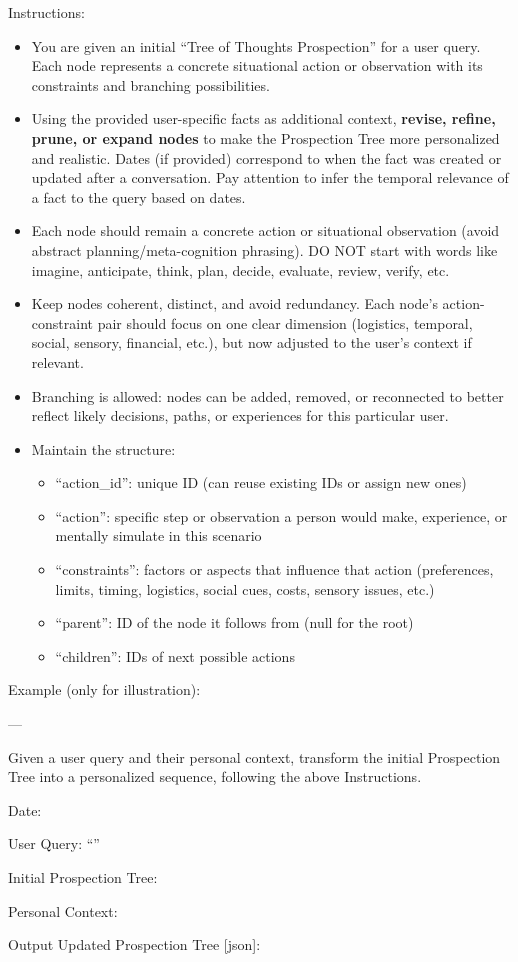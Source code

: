 \begin{promptbox}
Instructions:
\begin{itemize}
  \item You are given an initial ``Tree of Thoughts Prospection'' for a user query. Each node represents a concrete situational action or observation with its constraints and branching possibilities.
  \item Using the provided user-specific facts as additional context, \textbf{revise, refine, prune, or expand nodes} to make the Prospection Tree more personalized and realistic. Dates (if provided) correspond to when the fact was created or updated after a conversation. Pay attention to infer the temporal relevance of a fact to the query based on dates.
  \item Each node should remain a concrete action or situational observation (avoid abstract planning/meta-cognition phrasing). DO NOT start with words like imagine, anticipate, think, plan, decide, evaluate, review, verify, etc.
  \item Keep nodes coherent, distinct, and avoid redundancy. Each node’s action-constraint pair should focus on one clear dimension (logistics, temporal, social, sensory, financial, etc.), but now adjusted to the user’s context if relevant.
  \item Branching is allowed: nodes can be added, removed, or reconnected to better reflect likely decisions, paths, or experiences for this particular user.
  \item Maintain the structure:
  \begin{itemize}
    \item ``action\_id'': unique ID (can reuse existing IDs or assign new ones)
    \item ``action'': specific step or observation a person would make, experience, or mentally simulate in this scenario
    \item ``constraints'': factors or aspects that influence that action (preferences, limits, timing, logistics, social cues, costs, sensory issues, etc.)
    \item ``parent'': ID of the node it follows from (null for the root)
    \item ``children'': IDs of next possible actions
  \end{itemize}
\end{itemize}

Example (only for illustration):


---

Given a user query and their personal context, transform the initial Prospection Tree into a personalized sequence, following the above Instructions.

Date:   

User Query: ``''

Initial Prospection Tree: 

Personal Context:


Output Updated Prospection Tree [json]:
\end{promptbox}


